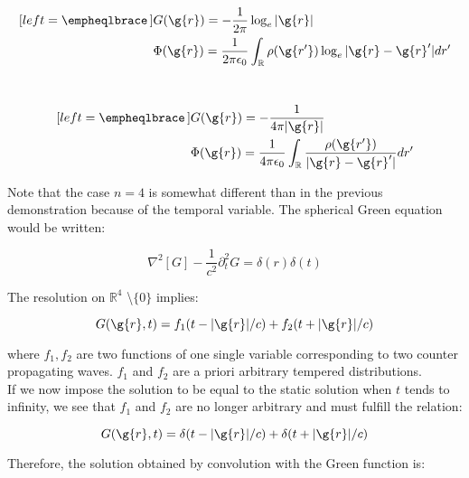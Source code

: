 \noindent {}\\
\begin{subequations}
\label{eq:TwoDimensionGreen}
\begin{align}[left = \empheqlbrace\,]
&  G(\g{r}) = -\frac{1}{2\pi}\log_e|\g{r}|\\
&  \Phi (\g{r}) = \frac{1}{2\pi\epsilon_0}\int_{\mathbb{R}}\rho(\g{r'})\log_e|\g{r}-\g{r}'|dr'
\end{align}
\end{subequations}

\noindent {}\\
\begin{subequations}
\label{eq:ThreeDimensionGreen}
\begin{align}[left = \empheqlbrace\,]
&  G(\g{r}) = -\frac{1}{4\pi|\g{r}|}\\
&  \Phi (\g{r}) = \frac{1}{4\pi\epsilon_0}\int_{\mathbb{R}}\frac{\rho(\g{r'})}{|\g{r}-\g{r}'|}dr'
\end{align}
\end{subequations}


\noindent Note that the case $n=4$ is somewhat different than in the previous demonstration because of the temporal variable. The spherical Green equation would be written:

\begin{equation}
\nabla^2[G]-\frac{1}{c^2}\partial_t^2 G = \delta(r)\delta(t)
\end{equation}


\noindent The resolution on $\mathbb{R}^4$ \textbackslash $\{0\}$ implies:

$$
G(\g{r},t) = f_1(t - |\g{r}|/c) + f_2(t + |\g{r}|/c) 
$$

\noindent where $f_1,f_2$ are two functions of one single variable corresponding to two counter propagating waves. $f_1$ and $f_2$ are a priori arbitrary tempered distributions. \\

\noindent If we now impose the solution to be equal to the static solution when $t$ tends to infinity, we see that $f_1$ and $f_2$ are no longer arbitrary and must fulfill the relation: 

\begin{equation}
G(\g{r},t) = \delta(t - |\g{r}|/c) + \delta(t + |\g{r}|/c) 
\end{equation}

\noindent Therefore, the solution obtained by convolution with the Green function is:

